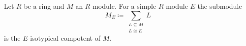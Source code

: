 \begin{defi}
 Let $R$ be a ring and $M$ an $R$-module. For a simple $R$-module $E$ the submodule
 \[
  M_E \coloneqq \sum_{\substack{L \subseteq M \\ L \cong E}} L
 \]
 is the $E$-isotypical compotent of $M$.
\end{defi}























